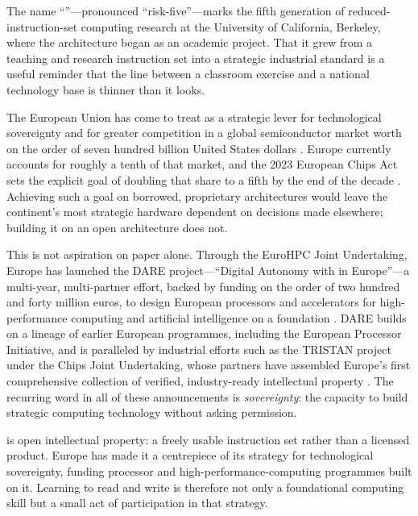 \begin{prgaside}
The name ``\riscv''---pronounced ``risk-five''---marks the fifth generation of
reduced-instruction-set computing research at the University of California,
Berkeley, where the architecture began as an academic project. That it grew from
a teaching and research instruction set into a strategic industrial standard is a
useful reminder that the line between a classroom exercise and a national
technology base is thinner than it looks.
\end{prgaside}

The European Union has come to treat \riscv as a strategic lever for
technological sovereignty and for greater competition in a global semiconductor
market worth on the order of seven hundred billion United States dollars
\citep{hipeac2026uap}. Europe currently accounts for roughly a tenth of that
market, and the 2023 European Chips Act sets the explicit goal of doubling that
share to a fifth by the end of the decade \citep{hipeac2026uap}. Achieving such a
goal on borrowed, proprietary architectures would leave the continent's most
strategic hardware dependent on decisions made elsewhere; building it on an open
architecture does not.

This is not aspiration on paper alone. Through the EuroHPC Joint Undertaking,
Europe has launched the DARE project---``Digital Autonomy with \riscv in
Europe''---a multi-year, multi-partner effort, backed by funding on the order of
two hundred and forty million euros, to design European processors and
accelerators for high-performance computing and artificial intelligence on a
\riscv foundation \citep{eurohpcdare,daremedium}. DARE builds on a lineage of
earlier European programmes, including the European Processor Initiative, and is
paralleled by industrial efforts such as the TRISTAN project under the Chips
Joint Undertaking, whose partners have assembled Europe's first comprehensive
collection of verified, industry-ready \riscv intellectual property
\citep{hipeac2026uap}. The recurring word in all of these announcements is
\emph{sovereignty}: the capacity to build strategic computing technology without
asking permission.

\begin{prgconcept}
\riscv is open intellectual property: a freely usable instruction set rather than
a licensed product. Europe has made it a centrepiece of its strategy for
technological sovereignty, funding processor and high-performance-computing
programmes built on it. Learning to read and write \riscv is therefore not only a
foundational computing skill but a small act of participation in that strategy.
\end{prgconcept}

